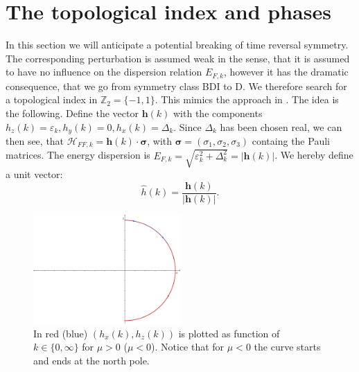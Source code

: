 \section{The topological index and phases}
\label{sec.topindexandphases}
In this section we will anticipate a potential breaking of time reversal symmetry. The corresponding perturbation is assumed weak in the sense, that it is assumed to have no influence on the dispersion relation $E_{F,k}$, however it has the dramatic consequence, that we go from symmetry class BDI to D. We therefore search for a topological index in $\mathbb{Z}_2=\{-1,1\}$. This mimics the approach in \cite{Alicea}. The idea is the following. Define the vector $\mathbf{h}(k)$ with the components $h_z(k) = \varepsilon_k, h_y(k) = 0, h_x(k) = \Delta_k$. Since $\Delta_k$ has been chosen real, we can then see, that $\mathcal{H}_{FF,k} = \mathbf{h}(k)\cdot\boldsymbol\sigma$, with $\boldsymbol\sigma = (\sigma_1,\sigma_2,\sigma_3)$ containg the Pauli matrices. The energy dispersion is $E_{F,k} = \sqrt{\varepsilon^2_k + \Delta^2_k} = |\mathbf{h}(k)|$. We hereby define a unit vector:
\begin{equation}
\hat{h}(k) = \frac{\mathbf{h}(k)}{|\mathbf{h}(k)|}. 
\label{eq.hhatdefinition}
\end{equation}

\begin{figure} 
\begin{center}  
\includegraphics[width=0.5\textwidth]{Figures/Topologicalindex/topindex}  
\caption{In red (blue) $(h_x(k),h_z(k))$ is plotted as function of $k\in \{0, \infty\}$ for $\mu > 0$ ($\mu < 0$). Notice that for $\mu < 0$ the curve starts and ends at the north pole.}  
\label{fig.hhatplot}  
\end{center}    
\end{figure}

